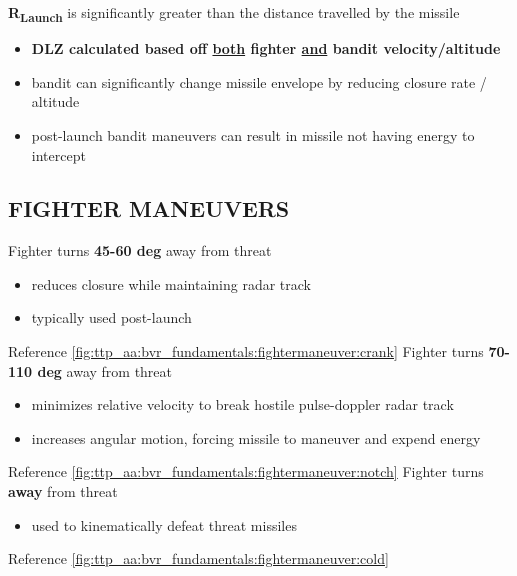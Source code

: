 \begin{tcoloritemize}
   \textbf{R\textsubscript{Launch}} is significantly greater than the distance travelled by the missile
    \begin{itemize}
        \item \textbf{DLZ calculated based off \underline{both} fighter \underline{and} bandit velocity/altitude}
        \item bandit can significantly change missile envelope by reducing closure rate / altitude
        \item post-launch bandit maneuvers can result in missile not having energy to intercept
    \end{itemize}
\end{tcoloritemize}

\clearpage

\subsection{FIGHTER MANEUVERS}

\begin{tcoloritemize}
    \blueitem[Crank]
    Fighter turns \textbf{45-60 deg} away from threat 

    \begin{itemize}
        \item reduces closure while maintaining radar track
        \item typically used post-launch
    \end{itemize}
    
    Reference \cref{fig:ttp_aa:bvr_fundamentals:fightermaneuver:crank}
    \blueitem[Notch]
    Fighter turns \textbf{70-110 deg} away from threat

    \begin{itemize}
        \item minimizes relative velocity to break hostile pulse-doppler radar track
        \item increases angular motion, forcing missile to maneuver and expend energy
    \end{itemize}
    
    Reference \cref{fig:ttp_aa:bvr_fundamentals:fightermaneuver:notch}
    Fighter turns \textbf{away} from threat

    \begin{itemize}
        \item used to kinematically defeat threat missiles
    \end{itemize}
    
    Reference \cref{fig:ttp_aa:bvr_fundamentals:fightermaneuver:cold}
\end{tcoloritemize}

